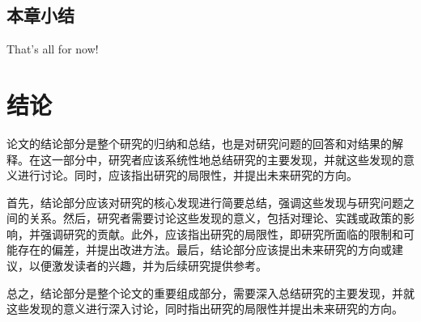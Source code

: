 \documentclass[master,academic]{ysuthesis} %
\begin{document}
	\section{本章小结}
		That's all for now!

	\chapter{结论}
		论文的结论部分是整个研究的归纳和总结，也是对研究问题的回答和对结果的解释。在这一部分中，研究者应该系统性地总结研究的主要发现，并就这些发现的意义进行讨论。同时，应该指出研究的局限性，并提出未来研究的方向。

		首先，结论部分应该对研究的核心发现进行简要总结，强调这些发现与研究问题之间的关系。然后，研究者需要讨论这些发现的意义，包括对理论、实践或政策的影响，并强调研究的贡献。此外，应该指出研究的局限性，即研究所面临的限制和可能存在的偏差，并提出改进方法。最后，结论部分应该提出未来研究的方向或建议，以便激发读者的兴趣，并为后续研究提供参考。

		总之，结论部分是整个论文的重要组成部分，需要深入总结研究的主要发现，并就这些发现的意义进行深入讨论，同时指出研究的局限性并提出未来研究的方向。


\end{document}

